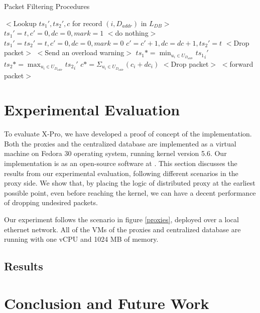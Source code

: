 \documentclass[sigplan,screen]{acmart}
\begin{document}
\begin{algorithm}
\caption{Packet Filtering Procedures}
\label{alg_pfs}
\begin{algorithmic}[1]
\State $<$Lookup $ts_1', ts_2',c$ for record $(i,D_{addr})$ in $L_{DB}>$
		\State $ts_1'=t,c'=0,dc=0,mark=1$
	\Else
		\State $<$do nothing$>$
	\EndIf
\Else
\State $ts_1'=ts_2'=t, c'=0, dc=0, mark=0$
\EndIf
\State $c'=c'+1, dc=dc+1, ts_2'=t$
		\State $<$Drop packet$>$
		\State $<$Send an overload warning$>$
	\EndIf
\EndIf
\State $ts_1* = \min_{u_i \in U_{D_{addr}}} {ts_1}_i'$
\State $ts_2* = \max_{u_i \in U_{D_{addr}}} {ts_2}_i'$
\State $c* = \Sigma_{u_i \in U_{D_{addr}}} (c_i+dc_i)$
		\State $<$Drop packet$>$
	\EndIf
\EndIf
\State $<$forward packet$>$
\end{algorithmic}
\end{algorithm}

\section{Experimental Evaluation}
To evaluate X-Pro, we have developed a proof of concept of the implementation. Both the proxies and the centralized database are implemented as a virtual machine on Fedora 30 operating system, running kernel version 5.6. Our implementation is as an open-source software at \cite{xpro}. This section discusses the results from our experimental evaluation, following different scenarios in the proxy side. We show that, by placing the logic of distributed proxy at the earliest possible point, even before reaching the kernel, we can have a decent performance of dropping undesired packets. 

Our experiment follows the scenario in figure \ref{proxies}, deployed over a local ethernet network. All of the VMs of the proxies and centralized database are running with one vCPU and 1024 MB of memory. 

\subsection{Results}

\section{Conclusion and Future Work}



\end{document}
